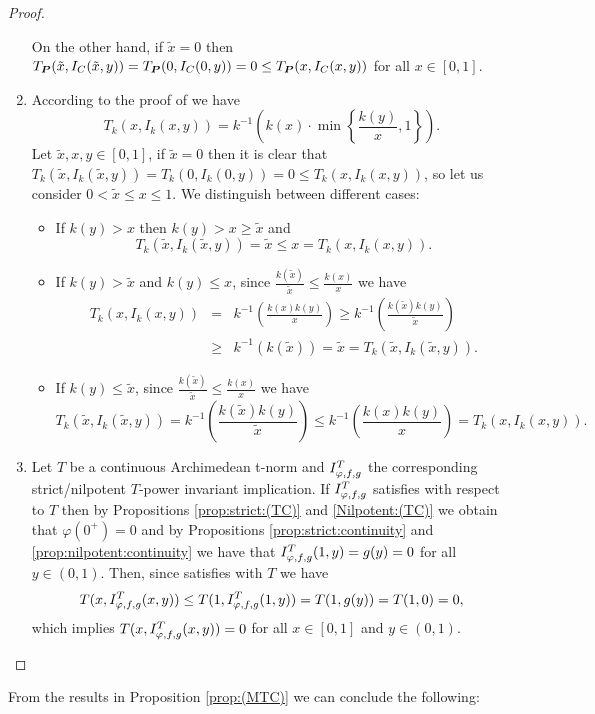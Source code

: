 \begin{proof}
\begin{enumerate}[label=(\roman*)]
		On the other hand, if $\tilde{x}=0$ then $T_{\bm{P}}(\tilde{x},I_C(\tilde{x},y))=T_{\bm{P}}(0,I_C(0,y)) = 0 \leq T_{\bm{P}}(x,I_C(x,y))$ for all $x \in [0,1]$.
		\item According to the proof of \cite[Proposition 11]{Zhou2021} we have 
		$$T_k(x,I_k(x,y)) = k^{-1} \left(k(x) \cdot \min\left\lbrace\frac{k(y)}{x},1\right\rbrace\right).$$
		Let $\tilde{x},x,y \in [0,1]$, if $\tilde{x}=0$ then it is clear that $T_k(\tilde{x},I_k(\tilde{x},y))=T_k(0,I_k(0,y))=0 \leq T_k(x,I_k(x,y))$, so let us consider $0<\tilde{x}\leq x \leq 1$. We distinguish between different cases:
		\begin{itemize}
			\item If $k(y)>x$ then $k(y) >x \geq \tilde{x}$ and
			$$T_k(\tilde{x},I_k(\tilde{x},y)) = \tilde{x} \leq x = T_k(x,I_k(x,y)).$$
			\item If $k(y)> \tilde{x}$ and $k(y)\leq x$, since $\frac{k(\tilde{x})}{\tilde{x}} \leq \frac{k(x)}{x}$ we have
			\begin{eqnarray*}
			T_k(x,I_k(x,y)) &=& k^{-1} \left(\frac{k(x)k(y)}{x}\right) \geq k^{-1} \left(\frac{k(\tilde{x})k(y)}{\tilde{x}}\right) \\
			&\geq& k^{-1}(k(\tilde{x})) =\tilde{x} = T_k(\tilde{x},I_k(\tilde{x},y)).
			\end{eqnarray*}
		\item If $k(y) \leq \tilde{x}$, since $\frac{k(\tilde{x})}{\tilde{x}} \leq \frac{k(x)}{x}$ we have
		$$
		T_k(\tilde{x},I_k(\tilde{x},y)) = k^{-1} \left(\frac{k(\tilde{x})k(y)}{\tilde{x}}\right) \leq k^{-1} \left(\frac{k(x)k(y)}{x}\right) = T_k(x,I_k(x,y)).
		$$
		\end{itemize}
		\item Let $T$ be a continuous Archimedean t-norm and $I^T_{\varphi,f,g}$ the corresponding strict/nilpotent $T$-power invariant implication. If $I^T_{\varphi,f,g}$ satisfies  \TC with respect to $T$ then by Propositions \ref{prop:strict:(TC)} and \ref{Nilpotent:(TC)} we obtain that $\varphi(0^+)=0$ and by Propositions \ref{prop:strict:continuity} and \ref{prop:nilpotent:continuity} we have that $I^T_{\varphi,f,g}(1,y)=g(y)=0$ for all $y \in (0,1)$. Then, since \IT satisfies \MTC with $T$ we have
		$$T(x,I^T_{\varphi,f,g}(x,y)) \leq T(1,I^T_{\varphi,f,g}(1,y))= T(1,g(y))=T(1,0)=0,$$
		which implies $T(x,I^T_{\varphi,f,g}(x,y)) = 0$ for all $x \in [0,1]$ and $y \in (0,1)$.
	\end{enumerate}
\end{proof}

From the results in Proposition \ref{prop:(MTC)} we can conclude the following:

